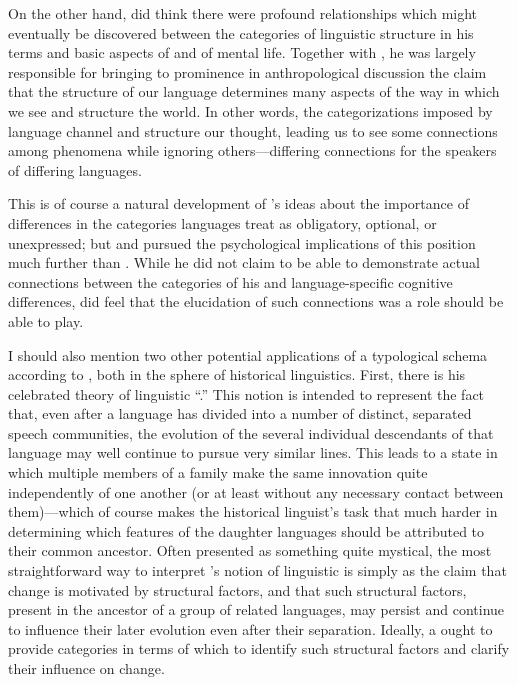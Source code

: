 On the other hand, {\Sapir} did think there were profound relationships
which might eventually be discovered between the categories of
linguistic structure in his terms and basic aspects of  and of
mental life. Together with , he was largely responsible
for bringing to prominence in anthropological discussion the claim
that the structure of our language determines many aspects of the way
in which we see and structure the world. In other words, the
categorizations imposed by language channel and structure our thought,
leading us to see some connections among phenomena while ignoring
others—differing connections for the speakers of differing
languages.

This is of course a natural development of {\Boas}'s ideas about the
importance of differences in the categories languages treat as
obligatory, optional, or unexpressed; but {\Sapir} and {\Whorf} pursued the
psychological implications of this position much further than
{\Boas}. While he did not claim to be able to demonstrate actual
connections between the categories of his  and
language-specific cognitive differences, {\Sapir} did feel that the
elucidation of such connections was a role  should be able to
play.

I should also mention two other potential applications of a
typological schema according to {\Sapir}, both in the sphere of
historical linguistics. First, there is his celebrated theory of
linguistic ``.'' This notion is intended to represent the fact
that, even after a language has divided into a number of distinct,
separated speech communities, the evolution of the several individual
descendants of that language may well continue to pursue very similar
lines. This leads to a state in which multiple members of a family
make the same innovation quite independently of one another (or at
least without any necessary contact between them)—which of course
makes the historical linguist's task that much harder in determining
which features of the daughter languages should be attributed to their
common ancestor. Often presented as something quite mystical, the most
straightforward way to interpret {\Sapir}'s notion of linguistic  is
simply as the claim that change is motivated by structural factors,
and that such structural factors, present in the ancestor of a group
of related languages, may persist and continue to influence their
later evolution even after their separation. Ideally, a  ought
to provide categories in terms of which to identify such structural
factors and clarify their influence on change.

